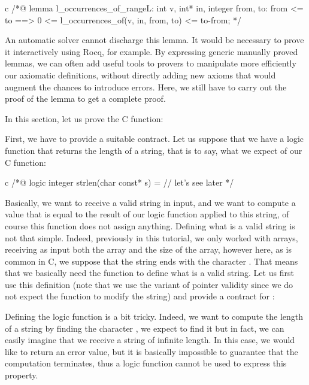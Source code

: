 \begin{CodeBlock}{c}
/*@
lemma l_occurrences_of_range{L}:
  \forall int v, int* in, integer from, to:
    from <= to ==> 0 <= l_occurrences_of(v, in, from, to) <= to-from;
*/
\end{CodeBlock}


An automatic solver cannot discharge this lemma. It would be necessary
to prove it interactively using Rocq, for example. By expressing generic
manually proved lemmas, we can often add useful tools to provers to
manipulate more efficiently our axiomatic definitions, without directly
adding new axioms that would augment the chances to introduce errors.
Here, we still have to carry out the proof of the lemma to get a complete
proof.




In this section, let us prove the C  function:




First, we have to provide a suitable contract. Let us suppose that we
have a logic function  that returns the length of a
string, that is to say, what we expect of our C function:


\begin{CodeBlock}{c}
/*@
  logic integer strlen(char const* s) = // let's see later
*/
\end{CodeBlock}


Basically, we want to receive a valid string in input, and we want to
compute a value that is equal to the result of our logic function
 applied to this string, of course this function
does not assign anything. Defining what is a valid string is not that
simple. Indeed, previously in this tutorial, we only worked with
arrays, receiving as input both the array and the size of the array,
however here, as is common in C, we suppose that the string ends
with the character . That means that we
basically need the  function to define what is a
valid string. Let us first use this definition (note that we use the
 variant of pointer validity
since we do not expect the function to modify the string) and provide
a contract for :




Defining the logic function  is a bit tricky. Indeed,
we want to compute the length of a string by finding the character
, we expect to find it but in fact, we
can easily imagine that we receive a string of infinite length. In this case,
we would like to return an error value, but it is basically impossible to
guarantee that the computation terminates, thus a logic function cannot
be used to express this property.


